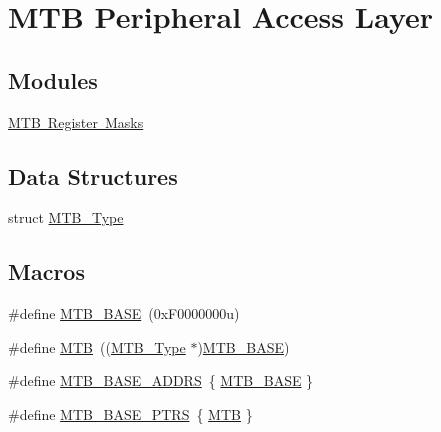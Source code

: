 \hypertarget{group___m_t_b___peripheral___access___layer}{}\section{M\+TB Peripheral Access Layer}
\label{group___m_t_b___peripheral___access___layer}
\subsection*{Modules}
\begin{DoxyCompactItemize}
\item 
\mbox{\hyperlink{group___m_t_b___register___masks}{M\+T\+B Register Masks}}
\end{DoxyCompactItemize}
\subsection*{Data Structures}
\begin{DoxyCompactItemize}
\item 
struct \mbox{\hyperlink{struct_m_t_b___type}{M\+T\+B\+\_\+\+Type}}
\end{DoxyCompactItemize}
\subsection*{Macros}
\begin{DoxyCompactItemize}
\item 
\#define \mbox{\hyperlink{group___m_t_b___peripheral___access___layer_ga64ea285c9775d03c2ab9d9194ad9c65c}{M\+T\+B\+\_\+\+B\+A\+SE}}~(0x\+F0000000u)
\item 
\#define \mbox{\hyperlink{group___m_t_b___peripheral___access___layer_ga09636f7f0071f50666d5747d44c6b94e}{M\+TB}}~((\mbox{\hyperlink{struct_m_t_b___type}{M\+T\+B\+\_\+\+Type}} $\ast$)\mbox{\hyperlink{group___m_t_b___peripheral___access___layer_ga64ea285c9775d03c2ab9d9194ad9c65c}{M\+T\+B\+\_\+\+B\+A\+SE}})
\item 
\#define \mbox{\hyperlink{group___m_t_b___peripheral___access___layer_ga8ab0e661d080b1d198725219f26f1efb}{M\+T\+B\+\_\+\+B\+A\+S\+E\+\_\+\+A\+D\+D\+RS}}~\{ \mbox{\hyperlink{group___m_t_b___peripheral___access___layer_ga64ea285c9775d03c2ab9d9194ad9c65c}{M\+T\+B\+\_\+\+B\+A\+SE}} \}
\item 
\#define \mbox{\hyperlink{group___m_t_b___peripheral___access___layer_ga45b3138a9794fd8f2c7613b48646e44f}{M\+T\+B\+\_\+\+B\+A\+S\+E\+\_\+\+P\+T\+RS}}~\{ \mbox{\hyperlink{group___m_t_b___peripheral___access___layer_ga09636f7f0071f50666d5747d44c6b94e}{M\+TB}} \}
\end{DoxyCompactItemize}


